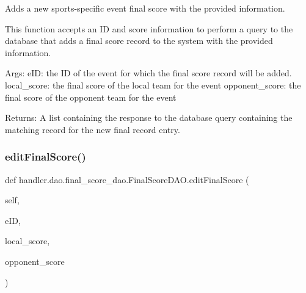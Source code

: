 \begin{DoxyVerb}Adds a new sports-specific event final score with the provided information.

This function accepts an ID and score information 
to perform a query to the database that adds a final score record 
to the system with the provided information.

Args:
    eID: the ID of the event for which the final score record will be added.
    local_score: the final score of the local team for the event
    opponent_score: the final score of the opponent team for the event
     
    
Returns:
    A list containing the response to the database query
    containing the matching record for the new final record entry. 
\end{DoxyVerb}
 \mbox{\label{classhandler_1_1dao_1_1final__score__dao_1_1_final_score_d_a_o_ab1aa9c08ee3c3daf1b5dd0a482f40e24}} 
\subsubsection{\texorpdfstring{edit\+Final\+Score()}{editFinalScore()}}
{\footnotesize\ttfamily def handler.\+dao.\+final\+\_\+score\+\_\+dao.\+Final\+Score\+D\+A\+O.\+edit\+Final\+Score (\begin{DoxyParamCaption}\item[{}]{self,  }\item[{}]{e\+ID,  }\item[{}]{local\+\_\+score,  }\item[{}]{opponent\+\_\+score }\end{DoxyParamCaption})}

